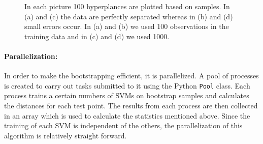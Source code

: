 \documentclass[a4paper]{article}
\begin{document}
\begin{figure}[!htb]
\begin{center}

\caption{In each picture 100 hyperplances are plotted based on samples. In (a) and (c) the data are perfectly separated whereas in (b) and (d) small errors occur. In (a) and (b) we used 100 observations in the training data and in (c) and (d) we used 1000.}
\label{fig2}
\end{center}
\end{figure}

\paragraph{Parallelization:} In order to make the bootstrapping efficient, it is parallelized. A pool of processes is created to carry out tasks submitted to it using the Python \texttt{Pool} class. Each process trains a certain numbers of SVMs on bootstrap samples and calculates the distances for each test point. The results from each process are then collected in an array which is used to calculate the statistics mentioned above. Since the training of each SVM is independent of the others, the parallelization of this algorithm is relatively straight forward.
\end{document}
